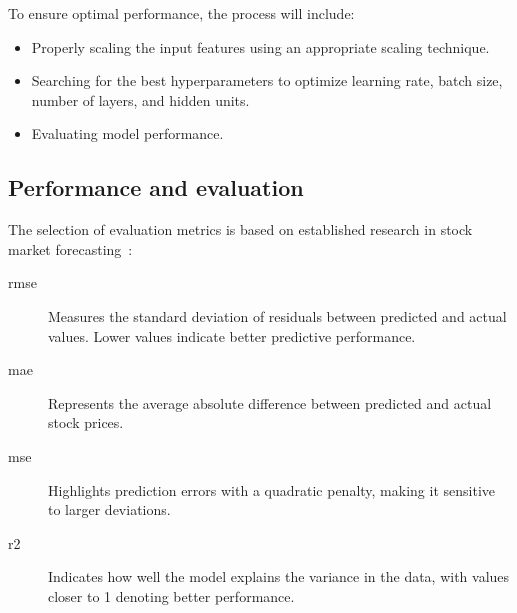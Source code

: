 To ensure optimal performance, the process will include:
\begin{itemize}
    \item Properly scaling the input features using an appropriate scaling technique.
    \item Searching for the best hyperparameters to optimize learning rate, batch size, number of layers, and hidden units.
    \item Evaluating model performance.
\end{itemize}

\subsection{Performance and evaluation}

The selection of evaluation metrics is based on established research in stock market 
forecasting~\parencite{agrawal2022StockPrediction, nabipour2020DeepLearning, guo2024LSTMStock}:

\begin{description}
\item[\acrfull{rmse}] Measures the standard deviation of residuals between predicted and 
                      actual values. Lower values indicate better predictive performance.
\item[\acrfull{mae}] Represents the average absolute difference between predicted and 
                     actual stock prices.
\item[\acrfull{mse}] Highlights prediction errors with a quadratic penalty, making it 
                     sensitive to larger deviations.
\item[\acrfull{r2}] Indicates how well the model explains the variance in the data, with values 
                    closer to 1 denoting better performance.
\end{description}




